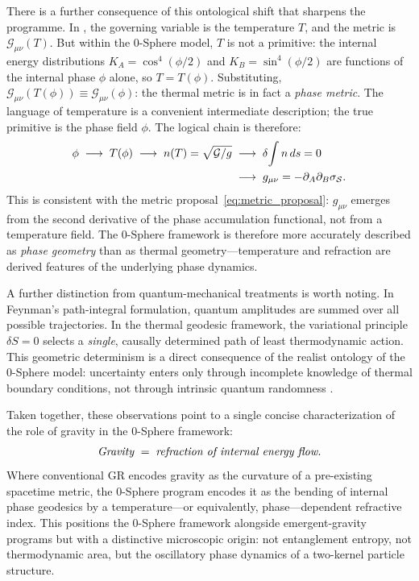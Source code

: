 \documentclass[%
 reprint, amsmath,amssymb, aps, prb, ]{revtex4-2}
\numberwithin{equation}{section}
\begin{document}
There is a further consequence of this ontological shift that sharpens the programme. In \cite{hanamura24}, the governing variable is the temperature $T$, and the metric is $\mathcal{G}_{\mu\nu}(T)$. But within the 0-Sphere model, $T$ is not a primitive: the internal energy distributions $K_A = \cos^4(\phi/2)$ and $K_B = \sin^4(\phi/2)$ are functions of the internal phase $\phi$ alone, so $T = T(\phi)$. Substituting, $\mathcal{G}_{\mu\nu}(T(\phi)) \equiv \mathcal{G}_{\mu\nu}(\phi)$: the thermal metric is in fact a \emph{phase metric}. The language of temperature is a convenient intermediate description; the true primitive is the phase field $\phi$. The logical chain is therefore:
\begin{align}
\phi
\;\longrightarrow\;
T(\phi)
\;\longrightarrow\;
n(T) = \sqrt{\mathcal{G}/g}
&\;\longrightarrow\;
\delta\!\int n\,ds = 0
\notag\\
&\;\longrightarrow\;
g_{\mu\nu} = -\partial_A\partial_B\sigma_{\mathcal{S}}.
\label{eq:phase_geometry_chain}
\end{align}
This is consistent with the metric proposal~\eqref{eq:metric_proposal}: $g_{\mu\nu}$ emerges from the second derivative of the phase accumulation functional, not from a temperature field. The 0-Sphere framework is therefore more accurately described as \emph{phase geometry} than as thermal geometry---temperature and refraction are derived features of the underlying phase dynamics.

A further distinction from quantum-mechanical treatments is worth noting. In Feynman's path-integral formulation, quantum amplitudes are summed over all possible trajectories. In the thermal geodesic framework, the variational principle $\delta S = 0$ selects a \emph{single}, causally determined path of least thermodynamic action. This geometric determinism is a direct consequence of the realist ontology of the 0-Sphere model: uncertainty enters only through incomplete knowledge of thermal boundary conditions, not through intrinsic quantum randomness \cite{hanamura36}.

Taken together, these observations point to a single concise characterization of the role of gravity in the 0-Sphere framework:
\begin{equation}
\text{\emph{Gravity}} \;=\; \text{\emph{refraction of internal energy flow.}}
\label{eq:gravity_refraction}
\end{equation}
Where conventional GR encodes gravity as the curvature of a pre-existing spacetime metric, the 0-Sphere program encodes it as the bending of internal phase geodesics by a temperature---or equivalently, phase---dependent refractive index. This positions the 0-Sphere framework alongside emergent-gravity programs \cite{Sakharov1967, Jacobson1995} but with a distinctive microscopic origin: not entanglement entropy, not thermodynamic area, but the oscillatory phase dynamics of a two-kernel particle structure.
\end{document}
